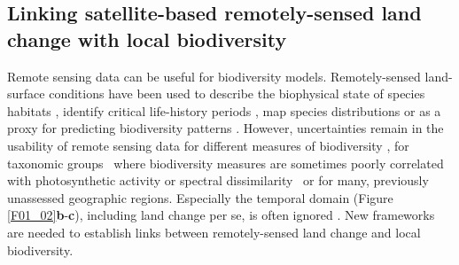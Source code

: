

\subsection{Linking satellite-based remotely-sensed land change with local biodiversity }
\label{C01_0103}

Remote sensing data can be useful for biodiversity models. Remotely-sensed land-surface conditions have been used to describe the biophysical state of species habitats \citep{Kerr2003}, identify critical life-history periods \citep{Pettorelli2005}, map species distributions \citep{He2015a} or as a proxy for predicting biodiversity patterns \citep{Rowhani2008,Rocchini2015,Hobi2017}. However, uncertainties remain in the usability of remote sensing data for different measures of biodiversity \citep{Oldeland2010}, for taxonomic groups \textendash\ where biodiversity measures are sometimes poorly correlated with photosynthetic activity \citep{Adler2011} or spectral dissimilarity \citep{Schmidtlein2017} \textendash\ or for many, previously unassessed geographic regions. Especially the temporal domain (Figure \ref{F01_02}\textbf{b}-\textbf{c}), including land change per se, is often ignored \citep{Kennedy2014}. New frameworks are needed to establish links between remotely-sensed land change and local biodiversity.

